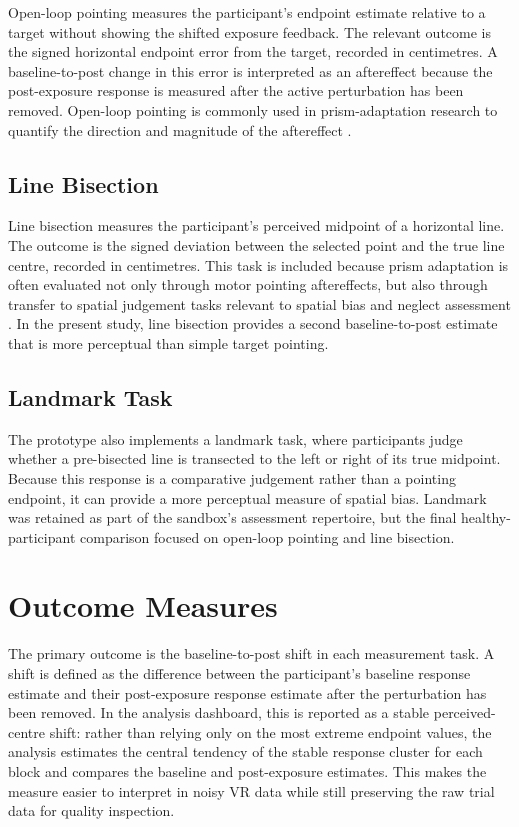 Open-loop pointing measures the participant's endpoint estimate relative to a target without showing the shifted exposure feedback. The relevant outcome is the signed horizontal endpoint error from the target, recorded in centimetres. A baseline-to-post change in this error is interpreted as an aftereffect because the post-exposure response is measured after the active perturbation has been removed. Open-loop pointing is commonly used in prism-adaptation research to quantify the direction and magnitude of the aftereffect \cite{Rossetti1998Prism,Serino2011,Ramos2019}.

\subsection{Line Bisection}
\label{subsec:method-line-bisection}

Line bisection measures the participant's perceived midpoint of a horizontal line. The outcome is the signed deviation between the selected point and the true line centre, recorded in centimetres. This task is included because prism adaptation is often evaluated not only through motor pointing aftereffects, but also through transfer to spatial judgement tasks relevant to spatial bias and neglect assessment \cite{frassinetti2002long,serino2006mechanisms,Serino2011}. In the present study, line bisection provides a second baseline-to-post estimate that is more perceptual than simple target pointing.

\subsection{Landmark Task}
\label{subsec:method-landmark}

The prototype also implements a landmark task, where participants judge whether a pre-bisected line is transected to the left or right of its true midpoint. Because this response is a comparative judgement rather than a pointing endpoint, it can provide a more perceptual measure of spatial bias. Landmark was retained as part of the sandbox's assessment repertoire, but the final healthy-participant comparison focused on open-loop pointing and line bisection.

\section{Outcome Measures}
\label{sec:method-outcome-measures}

The primary outcome is the baseline-to-post shift in each measurement task. A shift is defined as the difference between the participant's baseline response estimate and their post-exposure response estimate after the perturbation has been removed. In the analysis dashboard, this is reported as a stable perceived-centre shift: rather than relying only on the most extreme endpoint values, the analysis estimates the central tendency of the stable response cluster for each block and compares the baseline and post-exposure estimates. This makes the measure easier to interpret in noisy VR data while still preserving the raw trial data for quality inspection.

